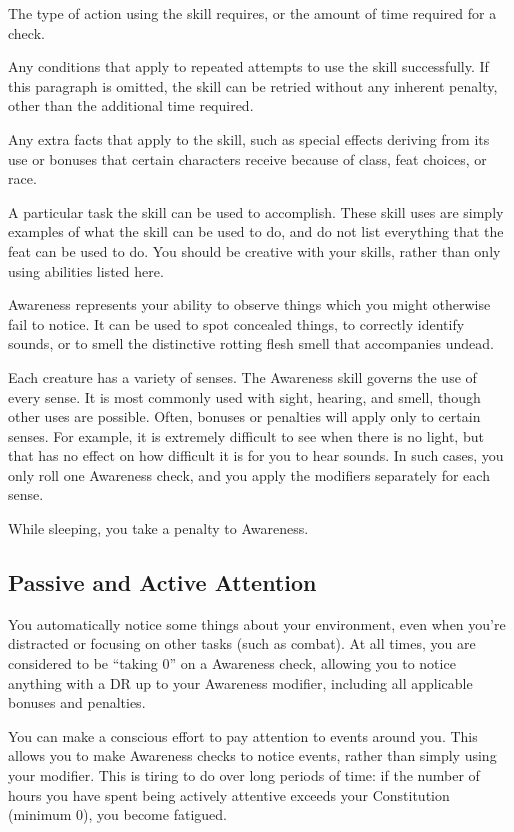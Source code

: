      The type of action using the skill requires, or the amount of time required for a check.

     Any conditions that apply to repeated attempts to use the skill successfully. If this paragraph is omitted, the skill can be retried without any inherent penalty, other than the additional time required.

     Any extra facts that apply to the skill, such as special effects deriving from its use or bonuses that certain characters receive because of class, feat choices, or race.

     A particular task the skill can be used to accomplish.
    These skill uses are simply examples of what the skill can be used to do, and do not list everything that the feat can be used to do.
    You should be creative with your skills, rather than only using abilities listed here.

    Awareness represents your ability to observe things which you might otherwise fail to notice. It can be used to spot concealed things, to correctly identify sounds, or to smell the distinctive rotting flesh smell that accompanies undead.

    Each creature has a variety of senses. The Awareness skill governs the use of every sense. It is most commonly used with sight, hearing, and smell, though other uses are possible. Often, bonuses or penalties will apply only to certain senses. For example, it is extremely difficult to see when there is no light, but that has no effect on how difficult it is for you to hear sounds. In such cases, you only roll one Awareness check, and you apply the modifiers separately for each sense.

    While sleeping, you take a  penalty to Awareness.

    \subsection{Passive and Active Attention}\label{Awareness-Passive and Active Attention}
        You automatically notice some things about your environment, even when you're distracted or focusing on other tasks (such as combat). At all times, you are considered to be ``taking 0'' on a Awareness check, allowing you to notice anything with a DR up to your Awareness modifier, including all applicable bonuses and penalties.

        You can make a conscious effort to pay attention to events around you. This allows you to make Awareness checks to notice events, rather than simply using your modifier. This is tiring to do over long periods of time: if the number of hours you have spent being actively attentive exceeds your Constitution (minimum 0), you become fatigued.

